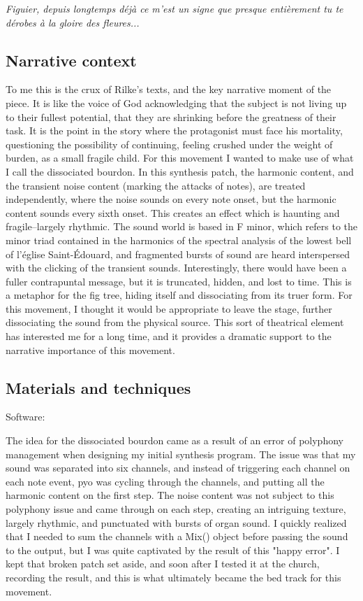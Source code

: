 \documentclass[12pt,twoside,maitrise]{dms_ks}
\theoremstyle{definition}
\begin{document}
\epigraph{\textit{Figuier, depuis longtemps déjà ce m'est un signe que presque entièrement tu te dérobes à la gloire des fleures...}}{}

\subsection{Narrative context}

To me this is the crux of Rilke's texts, and the key narrative moment of the piece.
It is like the voice of God acknowledging that the subject is not living up to their fullest potential, that they are shrinking before the greatness of their task.
It is the point in the story where the protagonist must face his mortality, questioning the possibility of continuing, feeling crushed under the weight of burden, as a small fragile child.
For this movement I wanted to make use of what I call the dissociated bourdon.
In this synthesis patch, the harmonic content, and the transient noise content (marking the attacks of notes), are treated independently, where the noise sounds on every note onset, but the harmonic content sounds every sixth onset.
This creates an effect which is haunting and fragile--largely rhythmic.
The sound world is based in F minor, which refers to the minor triad contained in the harmonics of the spectral analysis of the lowest bell of l'église Saint-Édouard, and fragmented bursts of sound are heard interspersed with the clicking of the transient sounds.
Interestingly, there would have been a fuller contrapuntal message, but it is truncated, hidden, and lost to time.
This is a metaphor for the fig tree, hiding itself and dissociating from its truer form.
For this movement, I thought it would be appropriate to leave the stage, further dissociating the sound from the physical source.
This sort of theatrical element has interested me for a long time, and it provides a dramatic support to the narrative importance of this movement.

\subsection{Materials and techniques}

Software:

The idea for the dissociated bourdon came as a result of an error of polyphony management when designing my initial synthesis program.
The issue was that my sound was separated into six channels, and instead of triggering each channel on each note event, pyo was cycling through the channels, and putting all the harmonic content on the first step.
The noise content was not subject to this polyphony issue and came through on each step, creating an intriguing texture, largely rhythmic, and punctuated with bursts of organ sound.
I quickly realized that I needed to sum the channels with a Mix() object before passing the sound to the output, but I was quite captivated by the result of this "happy error".
I kept that broken patch set aside, and soon after I tested it at the church, recording the result, and this is what ultimately became the bed track for this movement.
\end{document}
